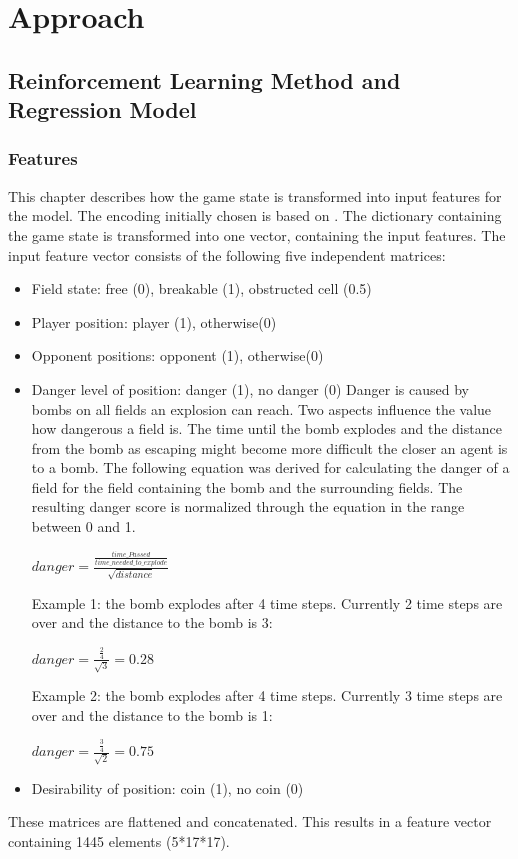\section{Approach} 
\label{approach}

\subsection{Reinforcement Learning Method and Regression Model} 
\label{ch:approachA}


\subsubsection{Features}
\label{ch:approachAa}

This chapter describes how the game state is transformed into input features for the model. 
The encoding initially chosen is based on \cite{Kormelink2018}. The dictionary containing the game state is transformed into one vector, containing the input features.
The input feature vector consists of the following five independent matrices:
\begin{itemize}
	\item Field state: free (0), breakable (1), obstructed cell (0.5)
	\item Player position: player (1), otherwise(0)
	\item Opponent positions: opponent (1), otherwise(0)
	\item Danger level of position: danger (1), no danger (0) \newline
	Danger is caused by bombs on all fields an explosion can reach. Two aspects influence the value how dangerous a field is. The time until the bomb explodes and the distance from the bomb as escaping might become more difficult the closer an agent is to a bomb. The following equation was derived for calculating the danger of a field for the field containing the bomb and the surrounding fields. The resulting danger score is normalized through the equation in the range between 0 and 1.
	
	$ danger = \frac{\frac{time\_Passed}{time\_needed\_to\_explode}}{\sqrt{distance}} $
	
	Example 1: the bomb explodes after 4 time steps. Currently 2 time steps are over and the distance to the bomb is 3:
	
	$ danger = \frac{\frac{2}{4}}{\sqrt{3}} = 0.28 $
	
	Example 2: the bomb explodes after 4 time steps. Currently 3 time steps are over and the distance to the bomb is 1:
	
	$ danger = \frac{\frac{3}{4}}{\sqrt{2}} = 0.75 $
	
	\item Desirability of position: coin (1), no coin (0)
\end{itemize}
These matrices are flattened and concatenated. This results in a feature vector containing 1445 elements (5*17*17).


